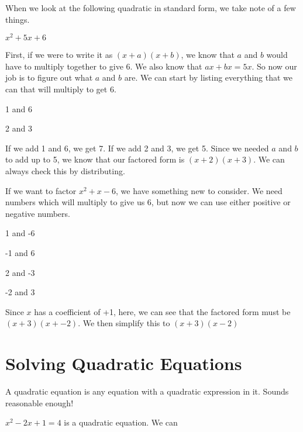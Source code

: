 \begin{example}

When we look at the following quadratic in standard form, we take note of a few things.

$x^2 + 5x + 6$

First, if we were to write it as $(x + a)(x + b)$, we know that $a$ and $b$ would have to multiply together to give 6.  We also know that $ax + bx = 5x$.  So now our job is to figure out what $a$ and $b$ are.  We can start by listing everything that we can that will multiply to get 6.

1 and 6

2 and 3

If we add 1 and 6, we get 7.  If we add 2 and 3, we get 5.  Since we needed $a$ and $b$ to add up to 5, we know that our factored form is $(x + 2)(x + 3)$.  We can always check this by distributing. 

\end{example}

\begin{example}

If we want to factor $x^2 +x - 6$, we have something new to consider.  We need numbers which will multiply to give us 6, but now we can use either positive or negative numbers.

1 and -6

-1 and 6

2 and -3

-2 and 3

Since $x$ has a coefficient of +1, here, we can see that the factored form must be $(x+3)(x + -2)$.  We then simplify this to $(x+3)(x - 2)$

\end{example}


\section*{Solving Quadratic Equations}

A quadratic equation is any equation with a quadratic expression in it.  Sounds reasonable enough!

\begin{example}
$x^2 - 2x + 1 = 4$ is a quadratic equation.  We can 
\end{example}